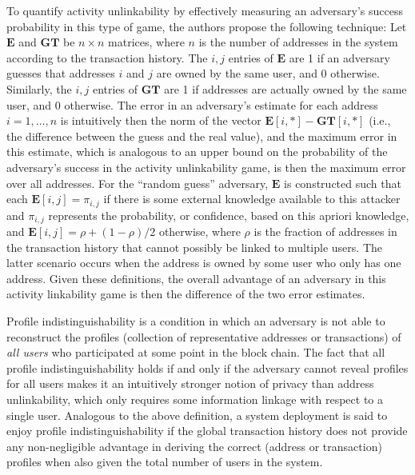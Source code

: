 To quantify activity unlinkability by effectively measuring an adversary's success probability in this type of game, the authors propose the following technique: Let $\mathbf{E}$ and $\mathbf{GT}$ be  $n \times n$ matrices, where $n$ is the number of addresses in the system according to the transaction history. The $i,j$ entries of $\mathbf{E}$ are 1 if an adversary guesses that addresses $i$ and $j$ are owned by the same user, and $0$ otherwise. Similarly, the $i,j$ entries of $\mathbf{GT}$ are 1 if addresses are actually owned by the same user, and 0 otherwise. The error in an adversary's estimate for each address $i = 1,\dots,n$ is intuitively then the norm of the vector $\mathbf{E}[i,*] - \mathbf{GT}[i,*]$ (i.e., the difference between the guess and the real value), and the maximum error in this estimate, which is analogous to an upper bound on the probability of the adversary's success in the activity unlinkability game, is then the maximum error over all addresses. For the ``random guess'' adversary, $\mathbf{E}$ is constructed such that each $\mathbf{E}[i,j] = \pi_{i,j}$ if there is some external knowledge available to this attacker and $\pi_{i,j}$ represents the probability, or confidence, based on this apriori knowledge, and $\mathbf{E}[i,j] = \rho + (1 - \rho)/2$ otherwise, where $\rho$ is the fraction of addresses in the transaction history that cannot possibly be linked to multiple users. The latter scenario occurs when the address is owned by some user who only has one address. Given these definitions, the overall advantage of an adversary in this activity linkability game is then the difference of the two error estimates. 

Profile indistinguishability is a condition in which an adversary is not able to reconstruct the profiles (collection of representative addresses or transactions) of \emph{all users} who participated at some point in the block chain. The fact that all profile indistinguishability holds if and only if the adversary cannot reveal profiles for all users makes it an intuitively stronger notion of privacy than address unlinkability, which only requires some information linkage with respect to a single user. Analogous to the above definition, a system deployment is said to enjoy profile indistinguishability if the global transaction history does not provide any non-negligible advantage in deriving the correct (address or transaction) profiles when also given the total number of users in the system. 


